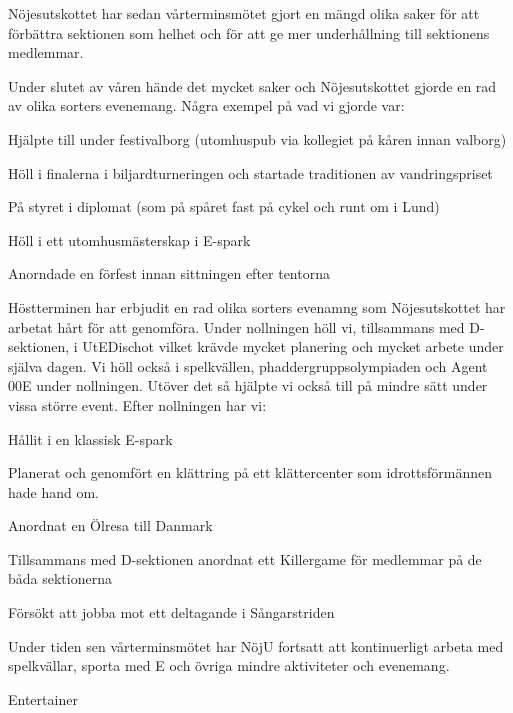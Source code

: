 \documentclass[../_main/handlingar.tex]{subfiles}
\begin{document}
Nöjesutskottet har sedan vårterminsmötet gjort en mängd olika saker för att förbättra sektionen som helhet och för att ge mer underhållning till sektionens medlemmar. 

Under slutet av våren hände det mycket saker och Nöjesutskottet gjorde en rad av olika sorters evenemang. Några exempel på vad vi gjorde var: 

\begin{dashlist}
    \item Hjälpte till under festivalborg (utomhuspub via kollegiet på kåren innan valborg)
    \item Höll i finalerna i biljardturneringen och startade traditionen av vandringspriset 
    \item På styret i diplomat  (som på spåret fast på cykel och runt om i Lund)
    \item Höll i ett utomhusmästerskap i E-spark 
    \item Anorndade en förfest innan sittningen efter tentorna    
\end{dashlist}

Höstterminen har erbjudit en rad olika sorters evenamng som Nöjesutskottet har arbetat hårt för att genomföra. Under nollningen höll vi, tillsammans med D-sektionen,  i UtEDischot vilket krävde mycket planering och mycket arbete  under själva dagen. Vi höll också i spelkvällen, phaddergruppsolympiaden och Agent 00E under nollningen. Utöver det så hjälpte vi också till på mindre sätt under vissa större event. Efter nollningen har vi: 

\begin{dashlist}
    \item Hållit i en klassisk E-spark 
    \item Planerat och genomfört en klättring på ett klättercenter som idrottsförmännen hade hand om. 
    \item Anordnat en Ölresa till Danmark
    \item Tillsammans med D-sektionen anordnat ett Killergame för medlemmar på de båda sektionerna 
    \item Försökt att jobba mot ett deltagande i Sångarstriden 
\end{dashlist}

Under tiden sen vårterminsmötet har NöjU fortsatt att kontinuerligt arbeta med spelkvällar, sporta med E och övriga mindre aktiviteter och evenemang. 

\begin{signatures}{1}
    \mvh
    \signature{Adam Belfrage}{Entertainer}
\end{signatures}
\end{document}
